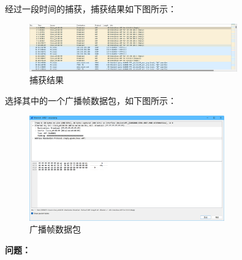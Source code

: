 \documentclass{article}
\begin{document}
经过一段时间的捕获，捕获结果如下图所示：

\begin{figure}[H]
  \centering
  \includegraphics[width=0.8\textwidth]{images/12.png}
  \caption{捕获结果}
\end{figure}

选择其中的一个广播帧数据包，如下图所示：

\begin{figure}[H]
  \centering
  \includegraphics[width=0.75\textwidth]{images/13.png}
  \caption{广播帧数据包}
\end{figure}

\textbf{问题：}
\end{document}
